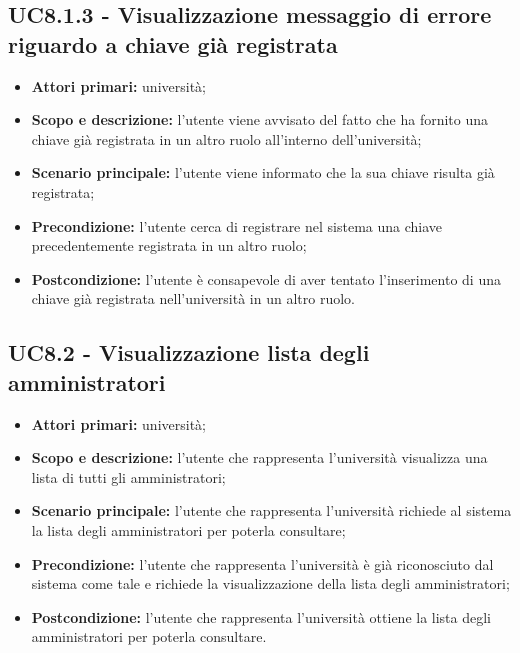\documentclass[AnalisiDeiRequisiti.tex]{subfiles}
\begin{document}
\subsection{UC8.1.3 - Visualizzazione messaggio di errore riguardo a chiave già registrata}
\begin{itemize}
	\item \textbf{Attori primari:} università;\\
	\item \textbf{Scopo e descrizione:} l'utente viene avvisato del fatto che ha fornito una chiave già registrata in un altro ruolo all'interno dell'università;\\
	\item \textbf{Scenario principale:} l'utente viene informato che la sua chiave risulta già registrata;\\
	\item \textbf{Precondizione:} l'utente cerca di registrare nel sistema una chiave precedentemente registrata in un altro ruolo;\\
	\item \textbf{Postcondizione:} l'utente è consapevole di aver tentato l'inserimento di una chiave già registrata nell'università in un altro ruolo.\\
\end{itemize}


\subsection{UC8.2 - Visualizzazione lista degli amministratori}
	\begin{itemize}
	\item \textbf{Attori primari:} università;\\
	\item \textbf{Scopo e descrizione:} l'utente che rappresenta l'università visualizza una lista di tutti gli amministratori;\\
	\item \textbf{Scenario principale:} l'utente che rappresenta l'università richiede al sistema la lista degli amministratori per poterla consultare;\\
	\item \textbf{Precondizione:} l'utente che rappresenta l'università è già riconosciuto dal sistema come tale e richiede la visualizzazione della lista degli amministratori;\\
	\item \textbf{Postcondizione:} l'utente che rappresenta l'università ottiene la lista degli amministratori per poterla consultare.\\
	\end{itemize}
\end{document}
